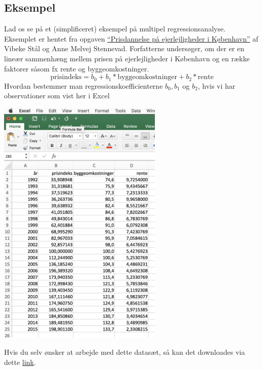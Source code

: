 \subsection{Eksempel}
Lad os se på et (simplificeret) eksempel på multipel regressionsanalyse. Eksemplet er hentet fra opgaven \href{http://studenttheses.cbs.dk/xmlui/handle/10417/6138}{``Prisdannelse på ejerlejligheder i København''}  af Vibeke Stål og Anne Melvej Stennevad. Forfatterne undersøger, om der er en lineær sammenhæng mellem prisen på ejerlejligheder i København og en række faktorer såsom fx rente og byggeomkostninger.
\begin{displaymath}\label{eq:model}
  \textrm{prisindeks} = b_0 + b_1 * \textrm{byggeomkostninger} + b_2 * \textrm{rente}
\end{displaymath}
Hvordan bestemmer man regressionskoefficienterne \(b_0, b_1\) og \(b_2\), hvis vi har observationer som vist her i Excel
\begin{center}
\includegraphics[height=12cm]{regression/images/data.JPG}
\end{center}
Hvis du selv ønsker at arbejde med dette datasæt, så kan det downloades via dette \href{https://gist.github.com/carsten-j/42595fb16fc646a22bf3f4bec1d81e59/archive/b45e8d1e5e14b83aa16daa652821a8d7b7a3b56d.zip}{link}.


